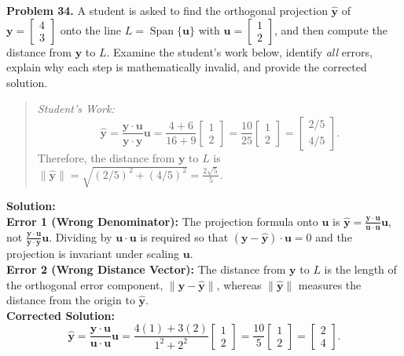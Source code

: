 \documentclass[11pt, letterpaper]{article}
\theoremstyle{definition}
\theoremstyle{remark}
\begin{document}
\textbf{Problem 34.} A student is asked to find the orthogonal projection $\hat{\mathbf{y}}$ of $\mathbf{y} = \begin{bmatrix} 4 \\ 3 \end{bmatrix}$ onto the line $L = \operatorname{Span}\{\mathbf{u}\}$ with $\mathbf{u} = \begin{bmatrix} 1 \\ 2 \end{bmatrix}$, and then compute the distance from $\mathbf{y}$ to $L$. Examine the student's work below, identify \textit{all} errors, explain why each step is mathematically invalid, and provide the corrected solution.
\begin{quote}
\textit{Student's Work:}
\[
\hat{\mathbf{y}} = \frac{\mathbf{y} \cdot \mathbf{u}}{\mathbf{y} \cdot \mathbf{y}}\mathbf{u} = \frac{4 + 6}{16 + 9}\begin{bmatrix} 1 \\ 2 \end{bmatrix} = \frac{10}{25}\begin{bmatrix} 1 \\ 2 \end{bmatrix} = \begin{bmatrix} 2/5 \\ 4/5 \end{bmatrix}.
\]
Therefore, the distance from $\mathbf{y}$ to $L$ is $\|\hat{\mathbf{y}}\| = \sqrt{(2/5)^2 + (4/5)^2} = \frac{2\sqrt{5}}{5}$.
\end{quote}
\textbf{Solution:} \\
\textbf{Error 1 (Wrong Denominator):} The projection formula onto $\mathbf{u}$ is $\hat{\mathbf{y}} = \frac{\mathbf{y} \cdot \mathbf{u}}{\mathbf{u} \cdot \mathbf{u}}\mathbf{u}$, not $\frac{\mathbf{y} \cdot \mathbf{u}}{\mathbf{y} \cdot \mathbf{y}}\mathbf{u}$. Dividing by $\mathbf{u} \cdot \mathbf{u}$ is required so that $(\mathbf{y} - \hat{\mathbf{y}}) \cdot \mathbf{u} = 0$ and the projection is invariant under scaling $\mathbf{u}$. \\
\textbf{Error 2 (Wrong Distance Vector):} The distance from $\mathbf{y}$ to $L$ is the length of the orthogonal error component, $\|\mathbf{y} - \hat{\mathbf{y}}\|$, whereas $\|\hat{\mathbf{y}}\|$ measures the distance from the origin to $\hat{\mathbf{y}}$. \\
\textbf{Corrected Solution:}
\[
\hat{\mathbf{y}} = \frac{\mathbf{y} \cdot \mathbf{u}}{\mathbf{u} \cdot \mathbf{u}}\mathbf{u} = \frac{4(1) + 3(2)}{1^2 + 2^2}\begin{bmatrix} 1 \\ 2 \end{bmatrix} = \frac{10}{5}\begin{bmatrix} 1 \\ 2 \end{bmatrix} = \begin{bmatrix} 2 \\ 4 \end{bmatrix}.
\]
\end{document}
